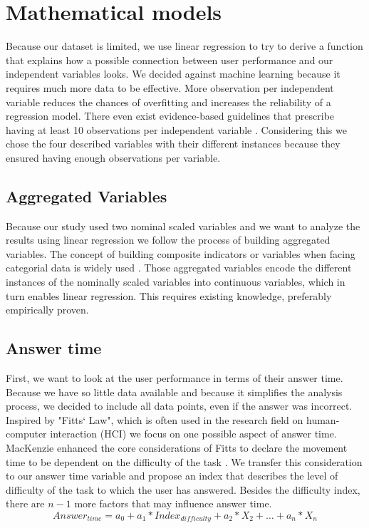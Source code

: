 
\chapter{Mathematical models}
Because our dataset is limited, we use linear regression to try to derive a function that explains how a possible connection 
between user performance and our independent variables looks. We decided against machine learning because it requires much more
data to be effective. More observation per independent variable reduces the chances of overfitting and increases the reliability of a regression
model. There even exist evidence-based guidelines that prescribe having at least 10 observations per independent variable \citep*{Harrell.2015}.
Considering this we chose the four described variables with their different instances because they ensured having enough observations per
variable.

\section{Aggregated Variables}
Because our study used two nominal scaled variables and we want to analyze the results using linear regression we follow the process
of building aggregated variables. The concept of building composite indicators or variables when facing categorial data is widely used
\citep*{MichelaNardo.2005, Lauro.2018}. Those aggregated variables encode the different instances of the nominally scaled variables into
continuous variables, which in turn enables linear regression. This requires existing knowledge, preferably empirically proven.
\section{Answer time}
First, we want to look at the user performance in terms of their answer time. Because we have so little data available and
because it simplifies the analysis process, we decided to include all data points, even if the answer was incorrect.
Inspired by "Fitts‘ Law", which is often used in the research field on human-computer interaction (HCI) we focus on one possible aspect of answer
time. MacKenzie enhanced the core considerations of Fitts to declare the movement time to be dependent on the difficulty of the task \citep*{MacKenzie.1992}.
We transfer this consideration to our answer time variable and propose an index that describes the level of difficulty of the task to which
the user has answered. Besides the difficulty index, there are $n-1$ more factors that may influence answer time.
\begin{equation} \label{answerTimeEquation}
    Answer_{time} = a_0 + a_1 * Index_{difficulty} + a_2 * X_2 + \dots + a_n * X_n
\end{equation}

